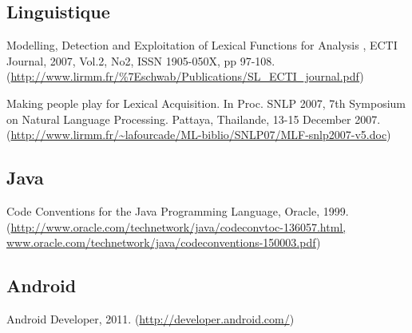 \documentclass[a4paper,11pt,french]{article}
\def\android{Android\texttrademark{}}
\begin{document}
{\subsection{Linguistique}

Modelling, Detection and Exploitation of Lexical Functions for Analysis , ECTI Journal, 2007, Vol.2, No2, ISSN 1905-050X, pp 97-108. (\url{http://www.lirmm.fr/\%7Eschwab/Publications/SL_ECTI_journal.pdf})

Making people play for Lexical Acquisition. In Proc. SNLP 2007, 7th Symposium on Natural Language Processing. Pattaya, Thailande, 13-15 December 2007. (\url{http://www.lirmm.fr/~lafourcade/ML-biblio/SNLP07/MLF-snlp2007-v5.doc})


\subsection{Java}

Code Conventions for the Java Programming Language, Oracle, 1999. (\url{http://www.oracle.com/technetwork/java/codeconvtoc-136057.html, www.oracle.com/technetwork/java/codeconventions-150003.pdf})

\subsection{\android{}}

Android Developer, 2011. (\url{http://developer.android.com/})






}
\end{document}
